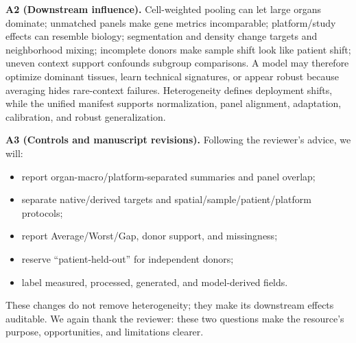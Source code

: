 \documentclass[10pt]{article}
\begin{document}
\textbf{A2 (Downstream influence).}\enspace
Cell-weighted pooling can let large organs dominate; unmatched panels make
gene metrics incomparable; platform/study effects can resemble biology;
segmentation and density change targets and neighborhood mixing; incomplete
donors make sample shift look like patient shift; uneven context support
confounds subgroup comparisons. A model may therefore optimize dominant
tissues, learn technical signatures, or appear robust because averaging hides
rare-context failures. Heterogeneity defines deployment shifts, while the
unified manifest supports normalization, panel alignment, adaptation,
calibration, and robust generalization.

\textbf{A3 (Controls and manuscript revisions).}\enspace
Following the reviewer's advice, we will:
\begin{itemize}
\item report organ-macro/platform-separated summaries and panel overlap;
\item separate native/derived targets and spatial/sample/patient/platform
protocols;
\item report Average/Worst/Gap, donor support, and missingness;
\item reserve ``patient-held-out'' for independent donors;
\item label measured, processed, generated, and model-derived fields.
\end{itemize}

These changes do not remove heterogeneity; they make its downstream effects
auditable. We again thank the reviewer: these two questions make the resource's
purpose, opportunities, and limitations clearer.
\end{document}
